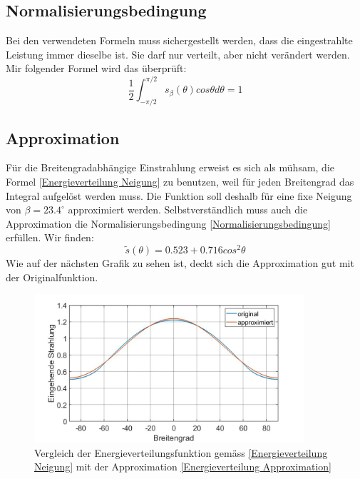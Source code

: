 \begin{refsection}
\subsection{Normalisierungsbedingung}
Bei den verwendeten Formeln muss sichergestellt werden, dass die eingestrahlte Leistung immer dieselbe ist. Sie darf nur verteilt, aber nicht verändert werden. Mir folgender Formel wird das überprüft:
\begin{equation}\label{Normalisierungsbedingung}
	\frac{1}{2}\int_{-\pi/2}^{\pi/2}s_{\beta}(\theta)cos\theta d\theta
	=
	1
\end{equation}
\subsection{Approximation}
Für die Breitengradabhängige Einstrahlung erweist es sich als mühsam, die Formel \ref{Energieverteilung Neigung} zu benutzen, weil für jeden Breitengrad das Integral aufgelöst werden muss. Die Funktion soll deshalb für eine fixe Neigung von $\beta=23.4^{\circ}$ approximiert werden. Selbstverständlich muss auch die Approximation die Normalisierungsbedingung \ref{Normalisierungsbedingung} erfüllen. Wir finden:
\begin{equation}\label{Energieverteilung Approximation}
	\tilde{s}(\theta)
	=
	0.523+0.716cos^{2}\theta
\end{equation}
Wie auf der nächsten Grafik zu sehen ist, deckt sich die Approximation gut mit der Originalfunktion.
\begin{figure}[H]
	\centering
	\includegraphics[width=10cm]{eis/Einstrahlung_approximiert_Vergleich.jpg}
	\caption{Vergleich der Energieverteilungsfunktion gemäss \ref{Energieverteilung Neigung} mit der Approximation \ref{Energieverteilung Approximation}}
\end{figure}

\end{refsection}
